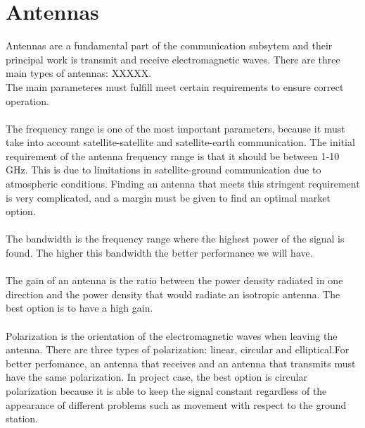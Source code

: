 \section{Antennas}
 
Antennas are a fundamental part of the communication subsytem and their principal work is transmit and receive electromagnetic waves.
There are three main types of antennas: XXXXX. \\
The main parameteres must fulfill meet certain requirements to ensure correct operation.

\paragraph{}
The frequency range is one of the most important parameters, because it must take into account satellite-satellite and satellite-earth communication. The initial requirement of the antenna frequency range is that it should be between 1-10 GHz. This is due to limitations in satellite-ground communication due to atmospheric conditions. Finding an antenna that meets this stringent requirement is very complicated, and a margin must be given to find an optimal market option.

\paragraph{}
The bandwidth is the frequency range where the highest power of the signal is found. The higher this bandwidth the better performance we will have.

\paragraph{}
The gain of an antenna is the ratio between the power density radiated in one direction and the power density that would radiate an isotropic antenna. The best option is to have a high gain. 

\paragraph{}
Polarization is the orientation of the electromagnetic waves when leaving the antenna. There are three types of polarization: linear, circular and elliptical.For better perfomance, an antenna that receives and an antenna that transmits must have the same polarization. In project case, the best option is circular polarization because it is able to keep the signal constant regardless of the appearance of different problems such as movement with respect to the ground station.

